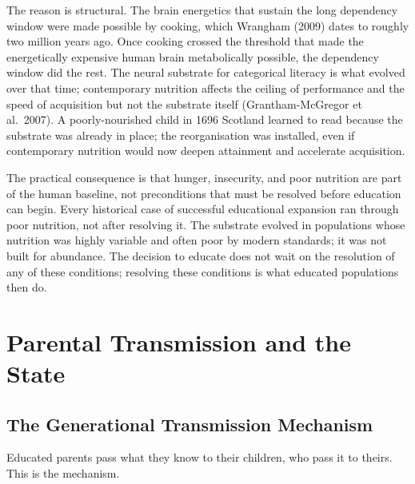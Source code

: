 \documentclass[12pt,letterpaper]{article}
\begin{document}
The reason is structural. The brain energetics that sustain the long
dependency window were made possible by cooking, which Wrangham
(2009) dates to roughly two million years ago. Once cooking crossed
the threshold that made the energetically expensive human brain
metabolically possible, the dependency window did the rest. The
neural substrate for categorical literacy is what evolved over that
time; contemporary nutrition affects the ceiling of performance and
the speed of acquisition but not the substrate itself
(Grantham-McGregor et al.\ 2007). A poorly-nourished child in 1696
Scotland learned to read because the substrate was already in place;
the reorganisation was installed, even if contemporary nutrition
would now deepen attainment and accelerate acquisition.

The practical consequence is that hunger, insecurity, and poor
nutrition are part of the human baseline, not preconditions that
must be resolved before education can begin. Every historical case of
successful educational expansion ran through poor nutrition, not
after resolving it. The substrate evolved in populations whose
nutrition was highly variable and often poor by modern standards;
it was not built for abundance. The decision to educate does not wait
on the resolution of any of these conditions; resolving these
conditions is what educated populations then do.

\section{Parental Transmission and the State}\label{pt-and-state}

\subsection{The Generational Transmission Mechanism}\label{the-generational-transmission-mechanism}

Educated parents pass what they know to their children, who pass it to theirs. This is the mechanism.
\end{document}
